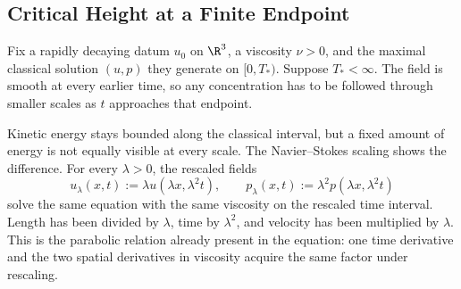 
\subsection{Critical Height at a Finite Endpoint}\label{sub:CriticalHeightAtAFiniteEndpoint}

Fix a rapidly decaying datum \(u_0\) on \(\R^3\), a viscosity \(\nu>0\), and the maximal classical solution \((u,p)\) they generate on \([0,T_*)\).
Suppose \(T_*<\infty\).
The field is smooth at every earlier time, so any concentration has to be followed through smaller scales as \(t\) approaches that endpoint.

Kinetic energy stays bounded along the classical interval, but a fixed amount of energy is not equally visible at every scale.
The Navier--Stokes scaling shows the difference.
For every \(\lambda>0\), the rescaled fields
\[
  u_\lambda(x,t)
  :=
  \lambda u(\lambda x,\lambda^2t),
  \qquad
  p_\lambda(x,t)
  :=
  \lambda^2p(\lambda x,\lambda^2t)
\]
solve the same equation with the same viscosity on the rescaled time interval.
Length has been divided by \(\lambda\), time by \(\lambda^2\), and velocity has been multiplied by \(\lambda\).
This is the parabolic relation already present in the equation: one time derivative and the two spatial derivatives in viscosity acquire the same factor under rescaling.

